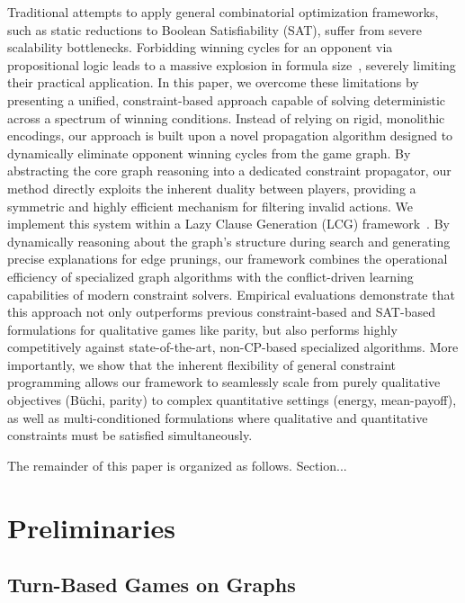 \documentclass[a4paper,fleqn]{cas-sc}
\begin{document}
Traditional attempts to apply general combinatorial optimization frameworks, such as static reductions to Boolean Satisfiability (SAT), suffer from severe scalability bottlenecks. Forbidding winning cycles for an opponent via propositional logic leads to a massive explosion in formula size~\cite{Heljanko:2012}, severely limiting their practical application. In this paper, we overcome these limitations by presenting a unified, constraint-based approach capable of solving deterministic \wregulargames across a spectrum of winning conditions. Instead of relying on rigid, monolithic encodings, our approach is built upon a novel propagation algorithm designed to dynamically eliminate opponent winning cycles from the game graph. By abstracting the core graph reasoning into a dedicated constraint propagator, our method directly exploits the inherent duality between players, providing a symmetric and highly efficient mechanism for filtering invalid actions.
%
We implement this system within a Lazy Clause Generation (LCG) framework~\cite{DBLP:journals/constraints/OhrimenkoSC09}. By dynamically reasoning about the graph's structure during search and generating precise explanations for edge prunings, our framework combines the operational efficiency of specialized graph algorithms with the conflict-driven learning capabilities of modern constraint solvers. Empirical evaluations \cite{Hernandez:2026:noc} demonstrate that this approach not only outperforms previous constraint-based and SAT-based formulations for qualitative games like parity, but also performs highly competitively against state-of-the-art, non-CP-based specialized algorithms. More importantly, we show that the inherent flexibility of general constraint programming allows our framework to seamlessly scale from purely qualitative objectives (Büchi, parity) to complex quantitative settings (energy, mean-payoff), as well as multi-conditioned formulations where qualitative and quantitative constraints must be satisfied simultaneously.

The remainder of this paper is organized as follows. Section...

\section{Preliminaries}\label{sec:prelims}


\subsection{Turn-Based Games on Graphs}
\label{sec:turn_based_games}
\end{document}
